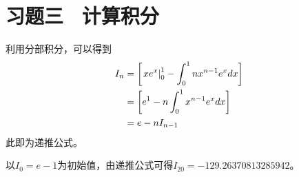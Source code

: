 \section{习题三 \ 计算积分}
利用分部积分，可以得到
\begin{align}
    I_n & = \left[\left.xe^x\right|^{1}_{0} - \int^{1}_{0}nx^{n-1}e^xdx \right] \\
        & = \left[e^1 - n\int^{1}_{0}x^{n-1}e^xdx\right] \notag                 \\
        & = e-nI_{n-1} \notag
\end{align}
此即为递推公式。

以$I_0=e-1$为初始值，由递推公式可得$I_{20}=-129.26370813285942$。

